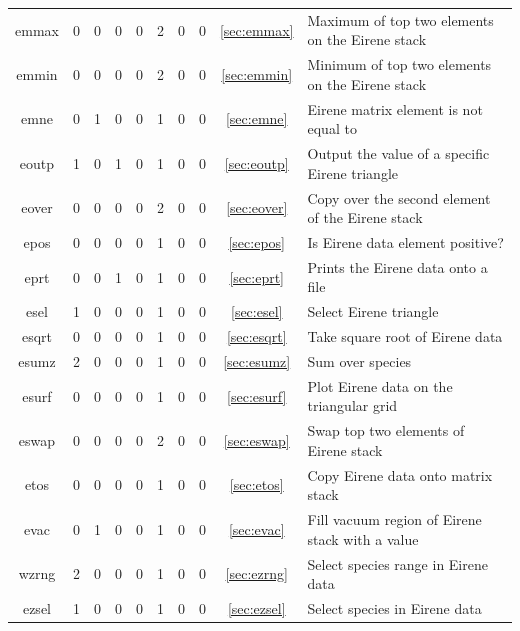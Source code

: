 \documentclass[a4paper,10pt]{report}
\begin{document}
\begin{center}
\begin{longtable}{|c|c|c|c|c|c|c|c|c|l|}
    emmax \index{b2plot, emmax}    & 0 & 0 & 0 & 0 & 2 & 0 & 0 & \ref{sec:emmax}    & Maximum of top two elements on the Eirene stack \\
    emmin \index{b2plot, emmin}    & 0 & 0 & 0 & 0 & 2 & 0 & 0 & \ref{sec:emmin}    & Minimum of top two elements on the Eirene stack \\
    emne \index{b2plot, emne}      & 0 & 1 & 0 & 0 & 1 & 0 & 0 & \ref{sec:emne}     & Eirene matrix element is not equal to \\
    eoutp \index{b2plot, eoutp}    & 1 & 0 & 1 & 0 & 1 & 0 & 0 & \ref{sec:eoutp}    & Output the value of a specific Eirene triangle \\
    eover \index{b2plot, eover}    & 0 & 0 & 0 & 0 & 2 & 0 & 0 & \ref{sec:eover}    & Copy over the second element of the Eirene stack \\
    epos \index{b2plot, epos}      & 0 & 0 & 0 & 0 & 1 & 0 & 0 & \ref{sec:epos}     & Is Eirene data element positive? \\
    eprt \index{b2plot, eprt}      & 0 & 0 & 1 & 0 & 1 & 0 & 0 & \ref{sec:eprt}     & Prints the Eirene data onto a file \\
    esel \index{b2plot, esel}      & 1 & 0 & 0 & 0 & 1 & 0 & 0 & \ref{sec:esel}     & Select Eirene triangle \\
    esqrt \index{b2plot, esqrt}    & 0 & 0 & 0 & 0 & 1 & 0 & 0 & \ref{sec:esqrt}    & Take square root of Eirene data \\
    esumz \index{b2plot, esumz}    & 2 & 0 & 0 & 0 & 1 & 0 & 0 & \ref{sec:esumz}    & Sum over species \\
    esurf \index{b2plot, esurf}    & 0 & 0 & 0 & 0 & 1 & 0 & 0 & \ref{sec:esurf}    & Plot Eirene data on the triangular grid \\
    eswap \index{b2plot, eswap}    & 0 & 0 & 0 & 0 & 2 & 0 & 0 & \ref{sec:eswap}    & Swap top two elements of Eirene stack \\
    etos \index{b2plot, etos}      & 0 & 0 & 0 & 0 & 1 & 0 & 0 & \ref{sec:etos}     & Copy Eirene data onto matrix stack \\
    evac \index{b2plot, evac}      & 0 & 1 & 0 & 0 & 1 & 0 & 0 & \ref{sec:evac}     & Fill vacuum region of Eirene stack with a value \\
    wzrng \index{b2plot, ezrng}    & 2 & 0 & 0 & 0 & 1 & 0 & 0 & \ref{sec:ezrng}    & Select species range in Eirene data \\
    ezsel \index{b2plot, ezsel}    & 1 & 0 & 0 & 0 & 1 & 0 & 0 & \ref{sec:ezsel}    & Select species in Eirene data \\

\end{longtable}
\end{center}
\end{document}
